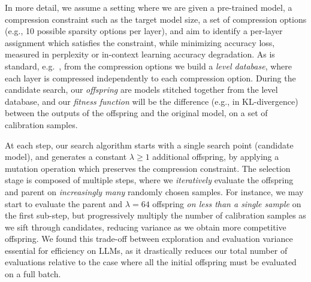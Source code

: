 \documentclass{article}
\theoremstyle{plain}
\theoremstyle{definition}
\theoremstyle{remark}
\begin{document}
In more detail, we assume a setting where we are given a pre-trained model, a compression constraint such as the target model size, a set of compression options (e.g., 10 possible sparsity options per layer), and aim to identify a per-layer assignment which satisfies the constraint, while minimizing accuracy loss, measured in perplexity or in-context learning accuracy degradation. 
As is standard, e.g.~\cite{frantar2022spdy}, from the compression options we build a \emph{level database}, where each layer is compressed independently to each compression option. 
During the candidate search, our \emph{offspring} are models stitched together from the level database, and our \emph{fitness function} will be the difference (e.g., in KL-divergence) between the outputs of the offspring and the original model, on a set of calibration samples. 

At each step, our search algorithm starts with a single search point (candidate model), and generates a constant $\lambda \geq 1$ additional offspring, by applying a mutation operation which preserves the compression constraint. The selection stage is composed of multiple steps, where we \emph{iteratively} evaluate the offspring and parent on \emph{increasingly many} randomly chosen samples. 
For instance, we may start to evaluate the parent and $\lambda = 64$ offspring \emph{on less than a single sample} on the first sub-step, but progressively multiply the number of calibration samples  
as we sift through candidates, reducing variance as we obtain more competitive offspring. 
We found this trade-off between exploration and evaluation variance essential for efficiency on LLMs, as it drastically reduces our total number of evaluations relative to the case where all the initial offspring must be evaluated on a full batch. 
\end{document}
